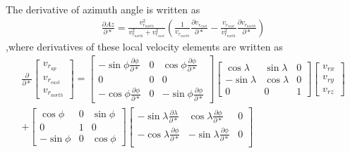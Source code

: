 \documentclass[11pt]{article}
\begin{document}
\noindent The derivative of azimuth angle is written as
\begin{equation}
	\label{eq:rel_velocity_Az_deriv}
	\begin{aligned}
		\frac{\partial Az}{\partial *} = \frac{v_{r_{north}}^2}{v_{r_{north}}^2 + v_{r_{east}}^2}
		\left(
		\frac{1}{v_{r_{north}}} \frac{\partial v_{r_{east}}}{\partial *} - \frac{v_{r_{east}}}{v_{r_{north}}^2} \frac{\partial v_{r_{north}}}{\partial *}
		\right)
	\end{aligned}
\end{equation}
,where derivatives of these local velocity elements are written as
\begin{equation}
	\label{eq:rel_velocity_local_deriv}
	\begin{aligned}
	\frac{\partial}{\partial *}
		\begin{bmatrix}
		v_{r_{up}}\\
		v_{r_{east}}\\
		v_{r_{north}}
		\end{bmatrix} =
		\begin{bmatrix}
		-\sin{\phi}\frac{\partial \phi}{\partial *} & 0 & \cos{\phi}\frac{\partial \phi}{\partial *}\\
		0 & 0 & 0\\
		-\cos{\phi}\frac{\partial \phi}{\partial *} & 0 & -\sin{\phi}\frac{\partial \phi}{\partial *}
		\end{bmatrix}
		\begin{bmatrix}
		\cos{\lambda} & \sin{\lambda} & 0\\
		-\sin{\lambda}& \cos{\lambda} & 0\\
		0 & 0 & 1
		\end{bmatrix}
		\begin{bmatrix}
		v_{rx}\\
		v_{ry}\\
		v_{rz}
		\end{bmatrix} \\
		+
		\begin{bmatrix}
		\cos{\phi} & 0 & \sin{\phi}\\
		0 & 1 & 0\\
		-\sin{\phi} & 0 & \cos{\phi}
		\end{bmatrix}
		\begin{bmatrix}
		-\sin{\lambda}\frac{\partial \lambda}{\partial *} & \cos{\lambda}\frac{\partial \phi}{\partial *} & 0\\
		-\cos{\lambda}\frac{\partial \phi}{\partial *}& -\sin{\lambda}\frac{\partial \phi}{\partial *} & 0\\

\end{bmatrix}
\end{aligned}
\end{equation}
\end{document}
